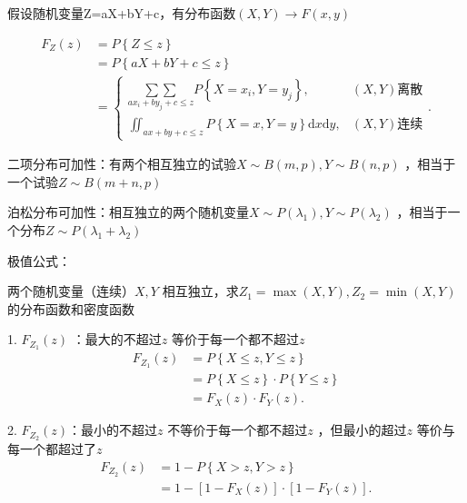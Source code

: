 假设随机变量Z=aX+bY+c，有分布函数$\left( X,Y \right) \to F\left( x,y \right) $

\begin{align*} 
    F_Z\left( z \right) &=P\left\{ Z\le z \right\} \\
                        &= P\left\{ aX+bY+c\le z \right\}  \\
                        &= \begin{cases}
                            \displaystyle{\underset{ax_{i}+by_{j}+c\le z}{\sum{\sum}}} P\left\{ X=x_{i},Y=y_{j} \right\} ,&\left( X,Y \right) \text{离散}\\
                            \displaystyle{\iint_{ax+by+c\le z}}P\left\{ X=x,Y=y \right\} \mathrm{d}x\mathrm{d}y,&\left( X,Y \right) \text{连续}
                        \end{cases} 
.\end{align*}
\begin{notation}
    二项分布可加性：有两个相互独立的试验$X\sim B\left( m,p \right) ,Y\sim B\left( n,p \right) $ ，相当于一个试验$Z\sim B\left( m+n,p \right) $ 

    泊松分布可加性：相互独立的两个随机变量$X\sim P\left( \lambda_1 \right) ,Y\sim P\left( \lambda_2 \right) $ ，相当于一个分布$Z\sim P\left( \lambda_1+\lambda_2 \right) $
\end{notation}
\begin{notation}
    极值公式：

    两个随机变量（连续）$X,Y$ 相互独立，求$Z_1=\max\left( X,Y \right) ,Z_2=\min\left( X,Y \right) $的分布函数和密度函数

    1. $F_{Z_1}\left( z \right) $ ：最大的不超过$z$ 等价于每一个都不超过$z$ 
    \begin{align*}
        F_{Z_1}\left( z \right) &= P\left\{ X\le z,Y\le z \right\} \\
                                &= P\left\{ X\le z \right\} \cdot P\left\{ Y\le z \right\}  \\
                                &=F_X\left( z \right) \cdot F_Y\left( z \right) 
    .\end{align*}

    2. $F_{Z_2}\left( z \right) $：最小的不超过$z$ 不等价于每一个都不超过$z$ ，但最小的超过$z$ 等价与每一个都超过了$z$ 
    \begin{align*}
        F_{Z_2}\left( z \right) &= 1-P\left\{ X>z,Y>z \right\}  \\
                                &= 1-[1-F_X\left( z \right) ]\cdot [1-F_Y\left( z \right) ] 
    .\end{align*}
\end{notation}
